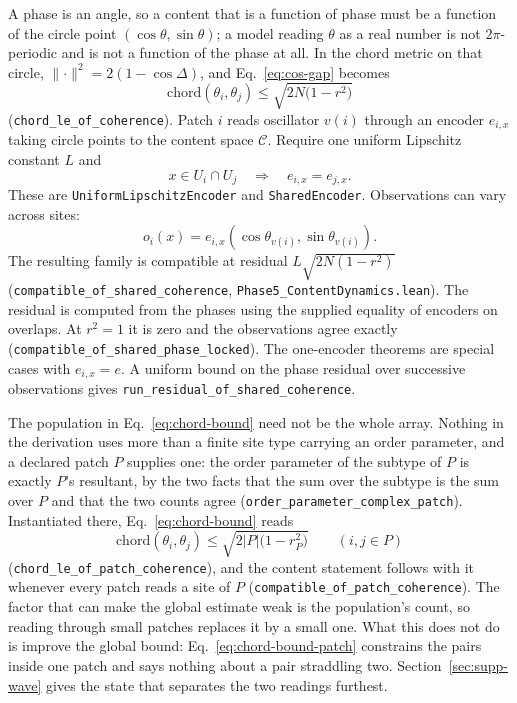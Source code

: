 \documentclass{article}
\begin{document}
A phase is an angle, so a content that is a function of phase must be a
function of the circle point $(\cos\theta,\sin\theta)$; a model reading
$\theta$ as a real number is not $2\pi$-periodic and is not a function of the
phase at all. In the chord metric on that circle,
$\lVert\cdot\rVert^2=2(1-\cos\Delta)$, and Eq.~\eqref{eq:cos-gap} becomes
\begin{equation}
 \mathrm{chord}(\theta_i,\theta_j)\le\sqrt{2N\bigl(1-r^{2}\bigr)}
 \label{eq:chord-bound}
\end{equation}
(\nolinkurl{chord_le_of_coherence}). Patch
$i$ reads oscillator $v(i)$ through an encoder $e_{i,x}$ taking circle points
to the content space $\mathcal{C}$. Require one uniform Lipschitz constant $L$ and
\[
 x\in U_i\cap U_j\quad\Longrightarrow\quad e_{i,x}=e_{j,x}.
\]
These are \texttt{UniformLipschitzEncoder} and \texttt{SharedEncoder}.
Observations can vary across sites:
\[
 o_i(x)=e_{i,x}(\cos\theta_{v(i)},\sin\theta_{v(i)}).
\]
The resulting family is compatible at residual
$L\sqrt{2N(1-r^{2})}$
(\nolinkurl{compatible_of_shared_coherence},
\nolinkurl{Phase5_ContentDynamics.lean}). The residual is computed
from the phases using the supplied equality of encoders on overlaps.
At $r^{2}=1$ it is zero and the observations agree exactly
(\nolinkurl{compatible_of_shared_phase_locked}).
The one-encoder theorems are special cases with $e_{i,x}=e$. A uniform bound on
the phase residual over successive observations gives
\nolinkurl{run_residual_of_shared_coherence}.

The population in Eq.~\eqref{eq:chord-bound} need not be the whole array.
Nothing in the derivation uses more than a finite site type carrying an order
parameter, and a declared patch $P$ supplies one: the order parameter of the
subtype of $P$ is exactly $P$'s resultant, by the two facts that the sum over
the subtype is the sum over $P$ and that the two counts agree
(\nolinkurl{order_parameter_complex_patch}).
Instantiated there, Eq.~\eqref{eq:chord-bound} reads
\begin{equation}
 \mathrm{chord}(\theta_i,\theta_j)\le\sqrt{2|P|\bigl(1-r_P^{2}\bigr)}
 \qquad (i,j\in P)
 \label{eq:chord-bound-patch}
\end{equation}
(\nolinkurl{chord_le_of_patch_coherence}),
and the content statement follows with it whenever every patch reads a site of
$P$ (\nolinkurl{compatible_of_patch_coherence}).
The factor that can make the global estimate weak is the population's count, so
reading through small patches replaces it by a small one. What this does not do
is improve the global bound: Eq.~\eqref{eq:chord-bound-patch} constrains the
pairs inside one patch and says nothing about a pair straddling two.
Section~\ref{sec:supp-wave} gives the state that separates the two readings
furthest.
\end{document}
